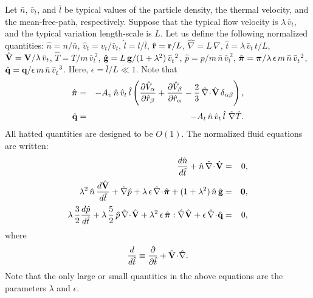 Let $\bar{n}$, $\bar{v}_t$, and $\bar{l}$ be typical values of the
particle density, the thermal velocity, and the mean-free-path, respectively.
Suppose that the typical flow velocity is $\lambda\,\bar{v}_t$,
and the typical variation length-scale is $L$. Let us
define the following normalized quantities: $\hat{n}=n/\bar{n}$, $\hat{v}_t=
v_t/\bar{v}_t$, $\hat{l} = l/\bar{l}$, $\hat{{\bf r}}= {\bf r}/ L$,
$\hat{\nabla} = L\,\nabla$, $\hat{t} = \lambda\,\bar{v}_t\,t/L$, 
$\hat{\bf V} = {\bf V}/\lambda\,\bar{v}_t$, 
$\hat{T} = T/m\,\bar{v}_t^{~2}$, 
$\hat{\bf g} = L\,{\bf g}/ (1+\lambda^2)\,\bar{v}_t^{~2}$,
$\hat{p}= p/m\,\bar{n}\,\bar{v}_t^{~2}$, $\hat{\mbox{\boldmath$\pi$}} =
\mbox{\boldmath$\pi$}/ \lambda\,\epsilon\,m\,\bar{n}\,\bar{v}_t^{~2}$, 
$\hat{\bf q}= {\bf q} / \epsilon\,m\,\bar{n}\,\bar{v}_t^{~3}$. Here,
$\epsilon = \bar{l}/L\ll 1$. 
Note that
\begin{eqnarray}
\hat{\mbox{\boldmath$\pi$}} &=& - A_v\,\hat{n}\,\hat{v}_t\,\hat{l}\left(
\frac{\partial\hat{V}_\alpha}{\partial\hat{r}_\beta}+
\frac{\partial\hat{V}_\beta    }{\partial\hat{r}_\alpha}-\frac{2}{3}\,\hat{\nabla}\!
\cdot\!\hat{\bf V}\,\delta_{\alpha\beta}\right),\\[0.5ex]
\hat{\bf q} &=& - A_t\,\hat{n}\,\hat{v}_t\,\hat{l}\,\,\hat{\nabla}\hat{T}.
\end{eqnarray}
All hatted quantities are designed to be
 $O(1)$.
The normalized fluid equations are written:
\begin{eqnarray}\label{e3.67a}
\frac{d\hat{n}}{d\hat{t}} + \hat{n}\,\hat{\nabla}\!\cdot\!\hat{\bf V} &=& 0,\\[0.5ex]
\lambda^2\,\hat{n}\,\frac{d \hat{\bf V}}{d\hat{t}} + \hat{\nabla} \hat{p}
 + \lambda\,\epsilon\,\hat{\nabla}\!\cdot \!\hat{\bpi} + (1+\lambda^2)
\,\hat{n}\,\hat{\bf g}
& =& {\bf 0},\\[0.5ex]
\lambda\,\frac{3}{2}\frac{d \hat{p}}{d\hat{t}} + 
\lambda\,\frac{5}{2}\,\hat{p}\,\hat{\nabla}\!\cdot\!
\hat{\bf V}
+ \lambda^2\,\epsilon\,\hat{\bpi}:\hat{\nabla}\hat{\bf V} + 
\epsilon\,\hat{\nabla}\!\cdot\!\hat{\bf q} &=& 0,\label{e3.67c}
\end{eqnarray}
where
\begin{equation}
\frac{d}{d\hat{t}}\equiv \frac{\partial}{\partial \hat{t}} + 
\hat{\bf V}\!\cdot\!\hat{\nabla}.
\end{equation}
Note that the only large or small quantities in the above equations are
the parameters $\lambda$ and $\epsilon$. 

